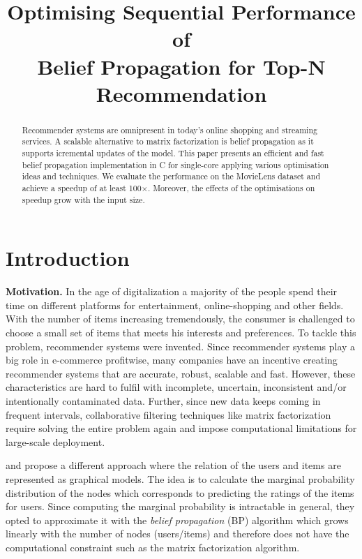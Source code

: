 \documentclass[draft,letterpaper]{article}
\title{Optimising Sequential Performance of\\ Belief Propagation for Top-N Recommendation}
\newcommand{\mypar}[1]{{\bf #1.}}
\begin{document}
%
\maketitle
%


\begin{abstract}
Recommender systems are omnipresent in today's online shopping and streaming services. A scalable alternative to matrix factorization is belief propagation as it supports icremental updates of the model. This paper presents an efficient and fast belief propagation implementation in C for single-core applying various optimisation ideas and techniques. We evaluate the performance on the MovieLens dataset and achieve a speedup of at least 100$\times$. Moreover, the effects of the optimisations on speedup grow with the input size.
\end{abstract}

\section{Introduction}\label{sec:intro}
\mypar{Motivation}
In the age of digitalization a majority of the people spend their time on different platforms for entertainment, online-shopping and other fields. With the number of items increasing tremendously, the consumer is challenged to choose a small set of items that meets his interests and preferences. To tackle this problem, recommender systems were invented. Since recommender systems play a big role in e-commerce profitwise, many companies have an incentive creating recommender systems that are accurate, robust, scalable and fast. However, these characteristics are hard to fulfil with incomplete, uncertain, inconsistent and/or intentionally contaminated data. Further, since new data keeps coming in frequent intervals, collaborative filtering techniques like matrix factorization require solving the entire problem again and impose computational limitations for large-scale deployment.

\citet{BPRS} and \citet{top-n-recommendation} propose a different approach where the relation of the users and items are represented as graphical models. The idea is to calculate the marginal probability distribution of the nodes which corresponds to predicting the ratings of the items for users. Since computing the marginal probability is intractable in general, they opted to approximate it with the \emph{belief propagation} (BP) algorithm which grows linearly with the number of nodes (users/items) and therefore does not have the computational constraint such as the matrix factorization algorithm.
\end{document}
